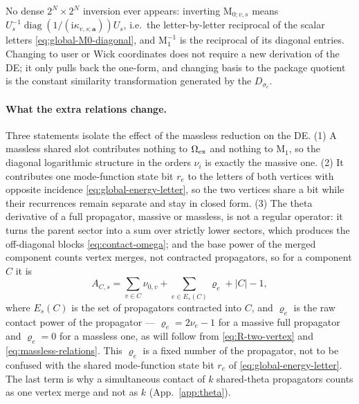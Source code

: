\documentclass[11pt,a4paper]{article}
\newcommand{\ii}{\mathrm i}
\newcommand{\diag}{\operatorname{diag}}
\begin{document}
No dense $2^N\times2^N$ inversion ever appears: inverting $\text{M}_{0;v,s}$ means
$U_s^{-1}\diag(1/(\ii\kappa_{v,s;\bm a}))U_s$, i.e.\ the letter-by-letter reciprocal of the scalar
letters \eqref{eq:global-M0-diagonal}, and $\text{M}_{1}^{-1}$ is the reciprocal of its diagonal
entries. Changing to user or Wick coordinates does not require a new derivation of the DE; it only
pulls back the one-form, and changing basis to the package quotient is the constant similarity
transformation generated by the $D_{\sigma_e}$.

\paragraph{What the extra relations change.}
Three statements isolate the effect of the massless reduction on the DE. (1) A massless shared slot
contributes nothing to $\Omega_{\rm ex}$ and nothing to $\text{M}_1$, so the diagonal logarithmic
structure in the orders $\nu_i$ is exactly the massive one. (2) It contributes one mode-function state bit $r_e$
to the letters of both vertices with opposite incidence \eqref{eq:global-energy-letter}, so the
two vertices share a bit while their recurrences remain separate and stay in closed form. (3) The
theta derivative of a full propagator, massive or massless, is not a regular operator: it turns the
parent sector into a sum over strictly lower sectors, which produces the off-diagonal blocks
\eqref{eq:contact-omega}; and the base power of the merged component counts vertex merges, not
contracted propagators, so for a component $C$ it is
\begin{equation}
  A_{C,s}=\sum_{v\in C}\nu_{0,v}+\sum_{e\in E_s(C)}\varrho_e+|C|-1,
  \label{eq:base-power}
\end{equation}
where $E_s(C)$ is the set of propagators contracted into $C$, and $\varrho_e$ is the raw contact power of the
propagator --- $\varrho_e=2\nu_e-1$ for a massive full propagator and $\varrho_e=0$ for a massless one, as
will follow from \eqref{eq:R-two-vertex} and \eqref{eq:massless-relations}. This $\varrho_e$ is a fixed
number of the propagator, not to be confused with the shared mode-function state bit $r_e$ of
\eqref{eq:global-energy-letter}. The last term is why a simultaneous contact of $k$ shared-theta
propagators counts as one vertex merge and not as $k$ (App.~\ref{app:theta}).
\end{document}

